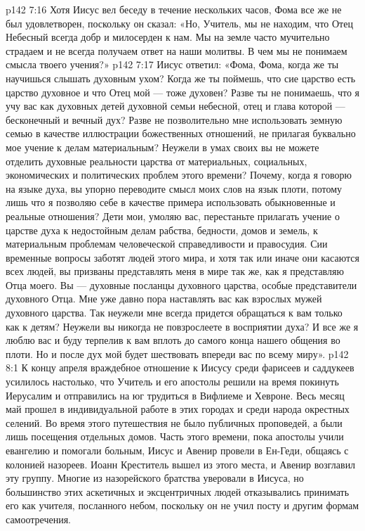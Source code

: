 \vs p142 7:16 Хотя Иисус вел беседу в течение нескольких часов, Фома все же не был удовлетворен, поскольку он сказал: «Но, Учитель, мы не находим, что Отец Небесный всегда добр и милосерден к нам. Мы на земле часто мучительно страдаем и не всегда получаем ответ на наши молитвы. В чем мы не понимаем смысла твоего учения?»
\vs p142 7:17 Иисус ответил: «Фома, Фома, когда же ты научишься слышать духовным ухом? Когда же ты поймешь, что сие царство есть царство духовное и что Отец мой --- тоже духовен? Разве ты не понимаешь, что я учу вас как духовных детей духовной семьи небесной, отец и глава которой --- бесконечный и вечный дух? Разве не позволительно мне использовать земную семью в качестве иллюстрации божественных отношений, не прилагая буквально мое учение к делам материальным? Неужели в умах своих вы не можете отделить духовные реальности царства от материальных, социальных, экономических и политических проблем этого времени? Почему, когда я говорю на языке духа, вы упорно переводите смысл моих слов на язык плоти, потому лишь что я позволяю себе в качестве примера использовать обыкновенные и реальные отношения? Дети мои, умоляю вас, перестаньте прилагать учение о царстве духа к недостойным делам рабства, бедности, домов и земель, к материальным проблемам человеческой справедливости и правосудия. Сии временные вопросы заботят людей этого мира, и хотя так или иначе они касаются всех людей, вы призваны представлять меня в мире так же, как я представляю Отца моего. Вы --- духовные посланцы духовного царства, особые представители духовного Отца. Мне уже давно пора наставлять вас как взрослых мужей духовного царства. Так неужели мне всегда придется обращаться к вам только как к детям? Неужели вы никогда не повзрослеете в восприятии духа? И все же я люблю вас и буду терпелив к вам вплоть до самого конца нашего общения во плоти. Но и после дух мой будет шествовать впереди вас по всему миру».
\vs p142 8:1 К концу апреля враждебное отношение к Иисусу среди фарисеев и саддукеев усилилось настолько, что Учитель и его апостолы решили на время покинуть Иерусалим и отправились на юг трудиться в Вифлиеме и Хевроне. Весь месяц май прошел в индивидуальной работе в этих городах и среди народа окрестных селений. Во время этого путешествия не было публичных проповедей, а были лишь посещения отдельных домов. Часть этого времени, пока апостолы учили евангелию и помогали больным, Иисус и Авенир провели в Ен\hyp{}Геди, общаясь с колонией назореев. Иоанн Креститель вышел из этого места, и Авенир возглавил эту группу. Многие из назорейского братства уверовали в Иисуса, но большинство этих аскетичных и эксцентричных людей отказывались принимать его как учителя, посланного небом, поскольку он не учил посту и другим формам самоотречения.
